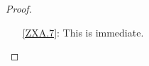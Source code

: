\begin{proof}
\begin{enumerate}
\item[\ref{ZXA.7}:]
This is immediate.

%
%

\end{enumerate}
\end{proof}
